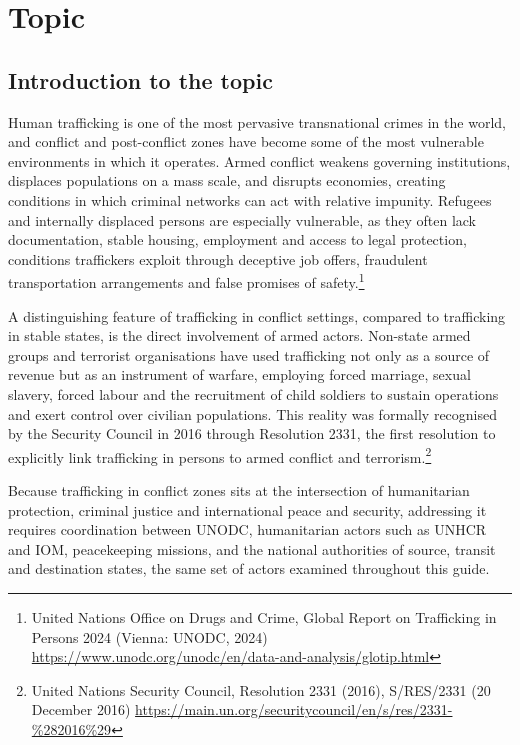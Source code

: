 \section{Topic}

\subsection{Introduction to the topic}

Human trafficking is one of the most pervasive transnational crimes in the world, and conflict and post-conflict zones have become some of the most vulnerable environments in which it operates. Armed conflict weakens governing institutions, displaces populations on a mass scale, and disrupts economies, creating conditions in which criminal networks can act with relative impunity. Refugees and internally displaced persons are especially vulnerable, as they often lack documentation, stable housing, employment and access to legal protection, conditions traffickers exploit through deceptive job offers, fraudulent transportation arrangements and false promises of safety.\footnote{United Nations Office on Drugs and Crime, Global Report on Trafficking in Persons 2024 (Vienna: UNODC, 2024) \url{https://www.unodc.org/unodc/en/data-and-analysis/glotip.html}}

A distinguishing feature of trafficking in conflict settings, compared to trafficking in stable states, is the direct involvement of armed actors. Non-state armed groups and terrorist organisations have used trafficking not only as a source of revenue but as an instrument of warfare, employing forced marriage, sexual slavery, forced labour and the recruitment of child soldiers to sustain operations and exert control over civilian populations. This reality was formally recognised by the Security Council in 2016 through Resolution 2331, the first resolution to explicitly link trafficking in persons to armed conflict and terrorism.\footnote{United Nations Security Council, Resolution 2331 (2016), S/RES/2331 (20 December 2016) \url{https://main.un.org/securitycouncil/en/s/res/2331-\%282016\%29}}

Because trafficking in conflict zones sits at the intersection of humanitarian protection, criminal justice and international peace and security, addressing it requires coordination between UNODC, humanitarian actors such as UNHCR and IOM, peacekeeping missions, and the national authorities of source, transit and destination states, the same set of actors examined throughout this guide.

